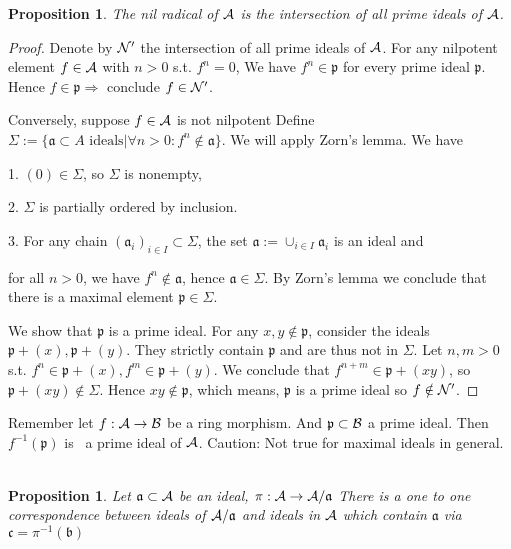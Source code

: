 \documentclass[11pt]{article}
\newtheorem{prop}[thm]{Proposition}
\newcommand{\sca}{{\mathfrak a}}
\newcommand{\scb}{{\mathfrak b}}
\newcommand{\scc}{{\mathfrak c}}
\newcommand{\scp}{{\mathfrak p}}
\newcommand{\cala}{{\cal A}}
\newcommand{\calb}{{\cal B}}
\newcommand{\caln}{{\cal N}}
\newcommand{\Lrta}{\Longrightarrow}
\begin{document}
\begin{prop}
The nil radical of $\cala$ is the intersection of all prime ideals of $\cala$.
\end{prop}
\begin{proof}
Denote by $\caln'$ the intersection of all prime ideals of $\cala$.
For any nilpotent element $f\in \cala$ with $n>0$ s.t. $f^n=0$,
We have $f^n\in \scp$ for every prime ideal $\scp$. Hence $f\in \scp\Lrta$ conclude $f\in \caln'$.

Conversely, suppose $f\in \cala$ is not nilpotent 
Define $\Sigma:=\{ \sca \subset A\text{ ideals} | \forall n>0: f^n\notin \sca\}$.
We will apply Zorn's lemma. 
We have 

    1.  $(0)\in \Sigma$, so $\Sigma$ is nonempty,

    2.  $\Sigma$ is partially ordered by inclusion.

    3.  For any chain $(\sca_i)_{i\in I}\subset \Sigma$, the set $\sca :=\cup_{i\in I}\sca_i$ is an ideal and 

    for all $n>0$, 
    we have $f^n \notin \sca$, hence $\sca \in \Sigma$.
By Zorn's lemma we conclude that there is a maximal element $\scp\in \Sigma$.

We show that $\scp$ is a prime ideal.
For any $x,y \notin \scp$, consider the ideals
$\scp+(x), \scp+(y)$. They strictly contain $\scp$ and are thus not in $\Sigma$.
Let $n,m>0$ s.t. $f^n\in \scp+(x), f^m\in \scp+(y)$.
We conclude that $f^{n+m}\in \scp+(xy)$, so $\scp+(xy) \notin \Sigma$.
Hence $xy \notin \scp$, which means, $\scp $ is a prime ideal so $f \notin \caln'$.
\end{proof}

Remember let $f:\cala \rightarrow \calb$ be a ring morphism. And $\scp\subset \calb$ a prime ideal. 
Then $f^{-1}(\scp)$ is  a prime ideal of $\cala$.
Caution: Not true for maximal ideals in general. 
 
\begin{prop}
Let $\sca\subset \cala$ be an ideal, $\pi : \cala\rightarrow \cala/\sca$
There is a one to one correspondence between ideals of $\cala/\sca$ and ideals in $\cala$ which contain
$\sca$ via $\scc=\pi^{-1}(\scb)$
\end{prop}
\end{document}
